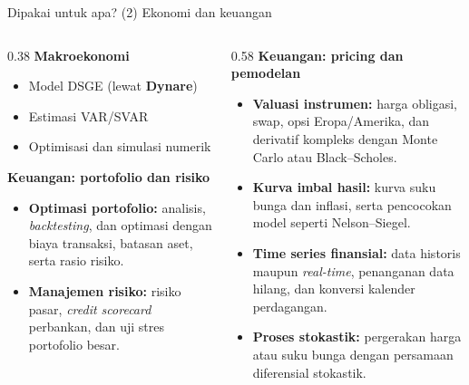 \documentclass[aspectratio=169,11pt]{beamer}
\begin{document}
\begin{frame}{Dipakai untuk apa? (2) Ekonomi dan keuangan}
\footnotesize
\begin{columns}[T]
\begin{column}{0.38\textwidth}
\textbf{Makroekonomi}
\begin{itemize}
  \item Model DSGE (lewat \textbf{Dynare})
  \item Estimasi VAR/SVAR
  \item Optimisasi dan simulasi numerik
\end{itemize}
\vspace{0.4em}
\textbf{Keuangan: portofolio dan risiko}
\begin{itemize}
  \item \textbf{Optimasi portofolio:} analisis, \emph{backtesting}, dan
        optimasi dengan biaya transaksi, batasan aset, serta rasio risiko.
  \item \textbf{Manajemen risiko:} risiko pasar, \emph{credit scorecard}
        perbankan, dan uji stres portofolio besar.
\end{itemize}
\end{column}
\begin{column}{0.58\textwidth}
\textbf{Keuangan: pricing dan pemodelan}
\begin{itemize}
  \item \textbf{Valuasi instrumen:} harga obligasi, swap, opsi Eropa/Amerika,
        dan derivatif kompleks dengan Monte Carlo atau Black--Scholes.
  \item \textbf{Kurva imbal hasil:} kurva suku bunga dan inflasi, serta
        pencocokan model seperti Nelson--Siegel.
  \item \textbf{Time series finansial:} data historis maupun
        \emph{real-time}, penanganan data hilang, dan konversi kalender
        perdagangan.
  \item \textbf{Proses stokastik:} pergerakan harga atau suku bunga dengan
        persamaan diferensial stokastik.
\end{itemize}
\end{column}
\end{columns}
\end{frame}
\end{document}
